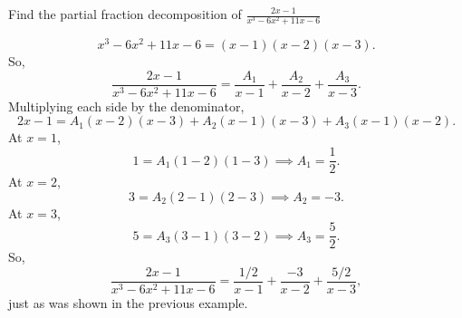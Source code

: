 \begin{example}
	Find the partial fraction decomposition of $\frac{2x-1}{x^3-6x^2+11x-6}$
\end{example}
\begin{answer}
	\begin{equation*}
		x^3-6x^2+11x-6 = (x-1)(x-2)(x-3).
	\end{equation*}
	So,
	\begin{equation*}
		\frac{2x-1}{x^3-6x^2+11x-6} = \frac{A_1}{x-1}+\frac{A_2}{x-2}+\frac{A_3}{x-3}.
	\end{equation*}
	Multiplying each side by the denominator,
	\begin{equation*}
		2x-1 = A_1(x-2)(x-3)+A_2(x-1)(x-3)+A_3(x-1)(x-2).
	\end{equation*}
	At $x=1$,
	\begin{equation*}
		1 = A_1(1-2)(1-3) \implies A_1 = \frac{1}{2}.
	\end{equation*}
	At $x=2$,
	\begin{equation*}
		3 = A_2(2-1)(2-3) \implies A_2 = -3.
	\end{equation*}
	At $x=3$,
	\begin{equation*}
		5 = A_3(3-1)(3-2) \implies A_3 = \frac{5}{2}.
	\end{equation*}
	So,
	\begin{equation*}
		\frac{2x-1}{x^3-6x^2+11x-6} = \frac{1/2}{x-1} + \frac{-3}{x-2} + \frac{5/2}{x-3},
	\end{equation*}
	just as was shown in the previous example.
\end{answer}